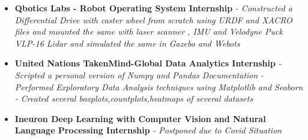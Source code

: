 \documentclass{article}
\begin{document}
    \begin{itemize}
        \item{\textbf{\large{Qbotics Labs - Robot Operating System Internship}}}
        \newline
        \textit{- Constructed a Differential Drive with caster wheel from scratch using URDF and XACRO files and mounted the same with laser scanner , IMU and Velodyne Puck VLP-16 Lidar and simulated the same in Gazebo and Webots}
    \end{itemize}
    \begin{itemize}
        \item{\textbf{\large{United Nations TakenMind-Global Data Analytics Internship}}}
        \newline
        \textit{- Scripted a personal version of Numpy and Pandas Documentation }
        \newline
        \textit{- Performed Exploratory Data Analysis techniques using Matplotlib and Seaborn }
        \newline
        \textit{- Created several boxplots,countplots,heatmaps of several datasets}
    \end{itemize}
    \begin{itemize}
        \item{\textbf{\large{Ineuron Deep Learning with Computer Vision and Natural Language Processing Internship}}}
        \newline
        \textit{- Postponed due to Covid Situation }
    \end{itemize}
\end{document}
